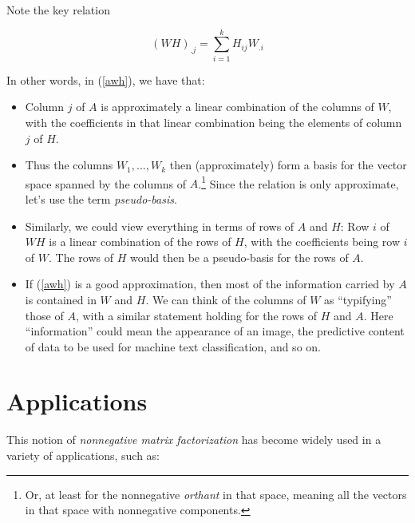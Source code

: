Note the key relation

\begin{equation}
(WH)_{.j} = \sum_{i=1}^k H_{ij} W_{.i}
\end{equation}

In other words, in (\ref{awh}), we have that:

\begin{itemize}

\item Column $j$ of $A$ is approximately a linear combination of the
columns of $W$, with the coefficients in that linear combination being
the elements of column $j$ of $H$.  

\item Thus the columns $W_1,...,W_k$ then (approximately) form a basis
for the vector space spanned by the columns of $A$.\footnote{Or, at
least for the nonnegative {\it orthant} in that space, meaning all the
vectors in that space with nonnegative components.}  Since the relation
is only approximate, let's use the term {\it pseudo-basis}.

\item Similarly, we could view everything in terms of rows of $A$ and $H$:
Row $i$ of $WH$ is a linear combination of the rows of $H$, with the
coefficients being row $i$ of $W$.  The rows of $H$ would then be a
pseudo-basis for the rows of $A$.

\item If (\ref{awh}) is a good approximation, then most of the
information carried by $A$ is contained in $W$ and $H$.  We can think of
the columns of $W$ as ``typifying'' those of $A$, with a similar
statement holding for the rows of $H$ and $A$.  Here ``information''
could mean the appearance of an image, the predictive content of data to
be used for machine text classification, and so on.

\end{itemize}

\section{Applications}

This notion of {\it nonnegative matrix factorization} has become widely
used in a variety of applications, such as:

